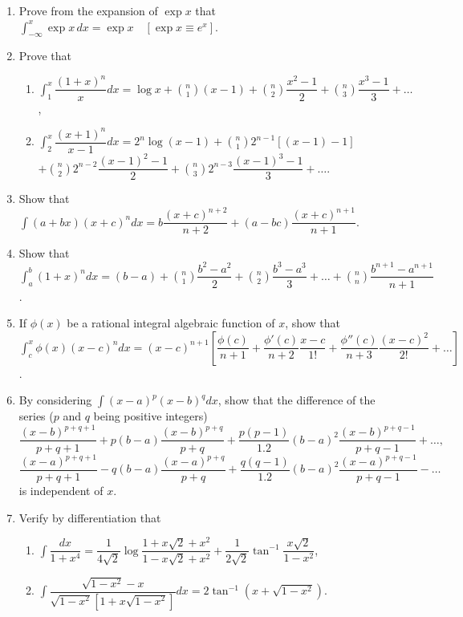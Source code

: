 \documentclass[11pt, a4paper]{article}
\begin{document}
\begin{enumerate}[leftmargin=2em]
\item Prove from the expansion of $\exp x$ that
$\displaystyle\int_{-\infty}^x \exp x\, dx = \exp x \quad [\exp x \equiv e^x]$.

\item Prove that
\begin{enumerate}[label=(\alph*)]
\item $\displaystyle\int_1^x \dfrac{(1+x)^n}{x}dx = \log x + \binom{n}{1}(x-1)+\binom{n}{2}\dfrac{x^2-1}{2}+\binom{n}{3}\dfrac{x^3-1}{3}+\dots$,
\item $\displaystyle\int_2^x \dfrac{(x+1)^n}{x-1}dx = 2^n\log(x-1)+\binom{n}{1}2^{n-1}[(x-1)-1]$
$+\binom{n}{2}2^{n-2}\dfrac{(x-1)^2-1}{2}+\binom{n}{3}2^{n-3}\dfrac{(x-1)^3-1}{3}+\dots$.
\end{enumerate}

\item Show that
$\displaystyle\int (a+bx)(x+c)^n dx = b\dfrac{(x+c)^{n+2}}{n+2}+(a-bc)\dfrac{(x+c)^{n+1}}{n+1}$.

\item Show that
$\displaystyle\int_a^b (1+x)^n dx = (b-a)+\binom{n}{1}\dfrac{b^2-a^2}{2}+\binom{n}{2}\dfrac{b^3-a^3}{3}+\dots+\binom{n}{n}\dfrac{b^{n+1}-a^{n+1}}{n+1}$.

\item If $\phi(x)$ be a rational integral algebraic function of $x$, show that
$\displaystyle\int_c^x \phi(x)(x-c)^n dx = (x-c)^{n+1}\left[\dfrac{\phi(c)}{n+1}+\dfrac{\phi'(c)}{n+2}\dfrac{x-c}{1!}+\dfrac{\phi''(c)}{n+3}\dfrac{(x-c)^2}{2!}+\dots\right]$.

\item By considering $\displaystyle\int (x-a)^p(x-b)^q dx$, show that the difference of the series ($p$ and $q$ being positive integers)
\[
\dfrac{(x-b)^{p+q+1}}{p+q+1}+p(b-a)\dfrac{(x-b)^{p+q}}{p+q}+\dfrac{p(p-1)}{1.2}(b-a)^2\dfrac{(x-b)^{p+q-1}}{p+q-1}+\dots,
\]
\[
\dfrac{(x-a)^{p+q+1}}{p+q+1}-q(b-a)\dfrac{(x-a)^{p+q}}{p+q}+\dfrac{q(q-1)}{1.2}(b-a)^2\dfrac{(x-a)^{p+q-1}}{p+q-1}-\dots
\]
is independent of $x$.

\item Verify by differentiation that
\begin{enumerate}[label=(\arabic*)]
\item $\displaystyle\int \dfrac{dx}{1+x^4} = \dfrac{1}{4\sqrt2}\log\dfrac{1+x\sqrt2+x^2}{1-x\sqrt2+x^2}+\dfrac{1}{2\sqrt2}\tan^{-1}\dfrac{x\sqrt2}{1-x^2}$,
\item $\displaystyle\int \dfrac{\sqrt{1-x^2}-x}{\sqrt{1-x^2}[1+x\sqrt{1-x^2}]}dx = 2\tan^{-1}(x+\sqrt{1-x^2})$.
\end{enumerate}


\end{enumerate}
\end{document}
